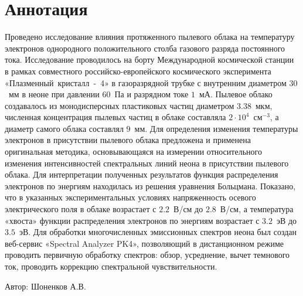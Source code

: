 \chapter*{Аннотация}

Проведено исследование влияния протяженного пылевого облака на температуру
электронов однородного положительного столба газового разряда постоянного
тока. Исследование проводилось на борту Международной космической станции в
рамках совместного российско-европейского космического эксперимента
«Плазменный~кристалл~-~4» в газоразрядной трубке с внутренним диаметром $30$~мм
в неоне при давлении $60$~Па и разрядном токе $1$~мА. Пылевое облако создавалось из
монодисперсных пластиковых частиц диаметром $3.38$~мкм, численная
концентрация пылевых частиц в облаке составляла $2\cdot10^4$~см$^{-3}$, а диаметр самого
облака составлял $9$~мм. Для определения изменения температуры электронов в
присутствии пылевого облака предложена и применена оригинальная методика,
основывающаяся на измерении относительного изменения интенсивностей
спектральных линий неона в присутствии пылевого облака. Для интерпретации
полученных результатов функция распределения электронов по энергиям
находилась из решения уравнения Больцмана. Показано, что в указанных
экспериментальных условиях напряженность осевого электрического поля в облаке
возрастает с $2.2$~В/см до $2.8$~В/см, а температура «хвоста» функции распределения
электронов по энергиям возрастает с $3.2$~эВ до $3.5$~эВ. Для обработки
многочисленных эмиссионных спектров неона был создан веб-сервис «Spectral
Analyzer PK4», позволяющий в дистанционном режиме проводить первичную
обработку спектров: обзор, усреднение, вычет темнового ток, проводить
коррекцию спектральной чувствительности.

\vfill
\vfill
\begin{minipage}{.49\textwidth}\end{minipage}
\hfill
\begin{minipage}{.49\textwidth}
    Автор: \uline{\hfill} Шоненков А.В.
\end{minipage}
\vfill

